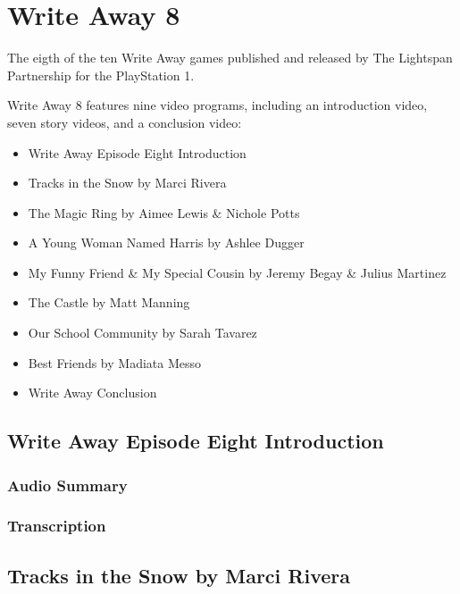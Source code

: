 \chapter{Write Away 8}


The eigth of the ten Write Away games published and released by The Lightspan Partnership for the PlayStation 1.

Write Away 8 features nine video programs, including an introduction video, seven story videos, and a conclusion video:

\begin{itemize}
    \item Write Away Episode Eight Introduction
    \item Tracks in the Snow by Marci Rivera
    \item The Magic Ring by Aimee Lewis \& Nichole Potts
    \item A Young Woman Named Harris by Ashlee Dugger
    \item My Funny Friend \& My Special Cousin by Jeremy Begay \& Julius Martinez
    \item The Castle by Matt Manning
    \item Our School Community by Sarah Tavarez
    \item Best Friends by Madiata Messo
    \item Write Away Conclusion
\end{itemize}

\clearpage
\newpage

\section{Write Away Episode Eight Introduction}

\subsection{Audio Summary}

\subsection{Transcription}

\section{Tracks in the Snow by Marci Rivera}

